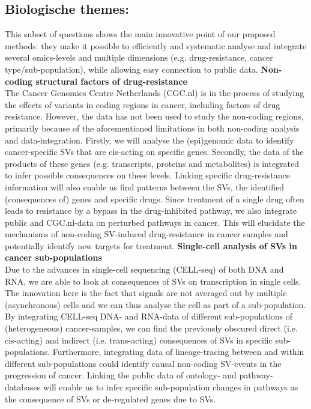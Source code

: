 \documentclass[twoside,fontsize=12pt]{article}
\begin{document}
\subsection*{		Biologische themes:}
This subset of questions shows the main innovative point of our proposed methods: they make it possible to efficiently and systematic analyse and integrate several omics-levels and multiple dimensions (e.g. drug-resistance, cancer type/sub-population), while allowing easy connection to public data.
\textbf{Non-coding structural factors of drug-resistance} \\
The Cancer Genomics Centre Netherlands (CGC.nl) is in the process of studying the effects of variants in coding regions in cancer, including factors of drug resistance. However, the data has not been used to study the non-coding regions, primarily because of the aforementioned limitations in both non-coding analysis and data-integration. Firstly, we will analyse the (epi)genomic data to identify cancer-specific SVs that are cis-acting on specific genes. Secondly, the data of the products of these genes (e.g. transcripts, proteins and metabolites) is integrated to infer possible consequences on these levels. Linking specific drug-resistance information will also enable us find patterns between the SVs, the identified (consequences of) genes and specific drugs. Since treatment of a single drug often leads to resistance by a bypass in the drug-inhibited pathway\cite{Prahallad2012}, we also integrate public and CGC.nl-data on perturbed pathways in cancer. This will elucidate the mechanisms of non-coding SV-induced drug-resistance in cancer samples and potentially identify new targets for treatment.
\textbf{Single-cell analysis of SVs in cancer sub-populations} \\
Due to the advances in single-cell sequencing (CELL-seq) of both DNA and RNA, we are able to look at consequences of SVs on transcription in single cells. The innovation here is the fact that signals are not averaged out by multiple (asynchronous) cells and we can thus analyse the cell as part of a sub-population. By integrating CELL-seq DNA- and RNA-data of different sub-populations of (heterogeneous) cancer-samples, we can find the previously obscured direct (i.e. cis-acting) and indirect (i.e. trans-acting) consequences of SVs in specific sub-populations. Furthermore, integrating data of lineage-tracing between and within different sub-populations could identify causal non-coding SV-events in the progression of cancer. Linking the public data of ontology- and pathway-databases will enable us to infer specific sub-population changes in pathways as the consequence of SVs or de-regulated genes due to SVs.
\end{document}
